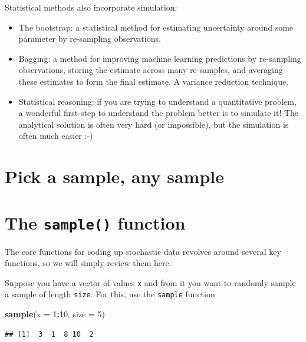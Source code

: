 \documentclass[]{book}
\newenvironment{Shaded}{\begin{snugshade}}{\end{snugshade}}
\newcommand{\DataTypeTok}[1]{\textcolor[rgb]{0.13,0.29,0.53}{#1}}
\newcommand{\DecValTok}[1]{\textcolor[rgb]{0.00,0.00,0.81}{#1}}
\newcommand{\KeywordTok}[1]{\textcolor[rgb]{0.13,0.29,0.53}{\textbf{#1}}}
\newcommand{\NormalTok}[1]{#1}
\newcommand{\OperatorTok}[1]{\textcolor[rgb]{0.81,0.36,0.00}{\textbf{#1}}}
\providecommand{\tightlist}{%
  \setlength{\itemsep}{0pt}\setlength{\parskip}{0pt}}
\theoremstyle{definition}
\theoremstyle{definition}
\theoremstyle{definition}
\theoremstyle{remark}
\begin{document}
Statistical methods also incorporate simulation:

\begin{itemize}
\tightlist
\item
  The bootstrap: a statistical method for estimating uncertainty around some parameter by re-sampling observations.
\item
  Bagging: a method for improving machine learning predictions by re-sampling observations, storing the estimate across many re-samples, and averaging these estimates to form the final estimate. A variance reduction technique.
\item
  Statistical reasoning: if you are trying to understand a quantitative problem, a wonderful first-step to understand the problem better is to simulate it! The analytical solution is often very hard (or impossible), but the simulation is often much easier :-)
\end{itemize}

\hypertarget{pick-a-sample-any-sample}{%
\section{Pick a sample, any sample}\label{pick-a-sample-any-sample}}

\hypertarget{the-sample-function}{%
\section{\texorpdfstring{The \texttt{sample()} function}{The sample() function}}\label{the-sample-function}}

The core functions for coding up stochastic data revolves around several key functions, so we will simply review them here.

Suppose you have a vector of values \texttt{x} and from it you want to randomly sample a sample of length \texttt{size}. For this, use the \texttt{sample} function

\begin{Shaded}
\begin{Highlighting}[]
\KeywordTok{sample}\NormalTok{(}\DataTypeTok{x =} \DecValTok{1}\OperatorTok{:}\DecValTok{10}\NormalTok{, }\DataTypeTok{size =} \DecValTok{5}\NormalTok{)}
\end{Highlighting}
\end{Shaded}

\begin{verbatim}
## [1]  3  1  8 10  2
\end{verbatim}
\end{document}
